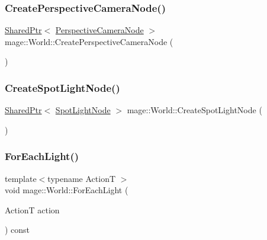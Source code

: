 \hypertarget{classmage_1_1_world_abe324aaa2f23ecc657a4632fabd58a5a}{}\label{classmage_1_1_world_abe324aaa2f23ecc657a4632fabd58a5a} 
\subsubsection{\texorpdfstring{Create\+Perspective\+Camera\+Node()}{CreatePerspectiveCameraNode()}}
{\footnotesize\ttfamily \hyperlink{namespacemage_a1e01ae66713838a7a67d30e44c67703e}{Shared\+Ptr}$<$ \hyperlink{namespacemage_a4542f24699be53c2f30040ce575155a7}{Perspective\+Camera\+Node} $>$ mage\+::\+World\+::\+Create\+Perspective\+Camera\+Node (\begin{DoxyParamCaption}{ }\end{DoxyParamCaption})}

\hypertarget{classmage_1_1_world_abe0930096614f179fa69fecf73f28fd3}{}\label{classmage_1_1_world_abe0930096614f179fa69fecf73f28fd3} 
\subsubsection{\texorpdfstring{Create\+Spot\+Light\+Node()}{CreateSpotLightNode()}}
{\footnotesize\ttfamily \hyperlink{namespacemage_a1e01ae66713838a7a67d30e44c67703e}{Shared\+Ptr}$<$ \hyperlink{namespacemage_ab9f49a82dd438032bb38c5436a657335}{Spot\+Light\+Node} $>$ mage\+::\+World\+::\+Create\+Spot\+Light\+Node (\begin{DoxyParamCaption}{ }\end{DoxyParamCaption})}

\hypertarget{classmage_1_1_world_a7f6e04d24be88ae3126021d1b935ef72}{}\label{classmage_1_1_world_a7f6e04d24be88ae3126021d1b935ef72} 
\subsubsection{\texorpdfstring{For\+Each\+Light()}{ForEachLight()}}
{\footnotesize\ttfamily template$<$typename ActionT $>$ \\
void mage\+::\+World\+::\+For\+Each\+Light (\begin{DoxyParamCaption}\item[{ActionT}]{action }\end{DoxyParamCaption}) const\hspace{0.3cm}{\ttfamily [private]}}

